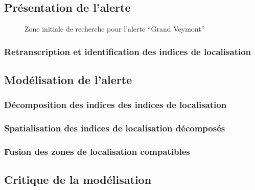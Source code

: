 

\subsection{Présentation de l'alerte}
\label{subsec:9-2-1}

\begin{figure}
  \centering
  
  \caption{Zone initiale de recherche pour l'alerte \enquote{Grand Veymont}}
  \label{fig:zir_grand_veyont}
\end{figure}



\subsubsection{Retranscription et identification des indices de localisation}
\label{subsec:9-2-1-1}

\subsection{Modélisation de l'alerte}
\label{subsec:9-2-2}


\subsubsection{Décomposition des indices des indices de localisation}
\label{subsec:9-2-2-2}

\subsubsection{Spatialisation des indices de localisation décomposés}
\label{subsec:9-2-2-3}

\subsubsection{Fusion des zones de localisation compatibles}
\label{subsec:9-2-2-4}

\subsection{Critique de la modélisation}
\label{subsec:9-2-3}


